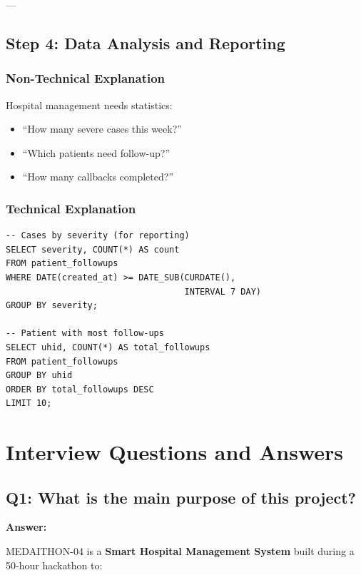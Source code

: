\documentclass[12pt,a4paper]{article}
\begin{document}
---

\subsection{Step 4: Data Analysis and Reporting}

\subsubsection{Non-Technical Explanation}

Hospital management needs statistics:

\begin{itemize}
    \item ``How many severe cases this week?''
    \item ``Which patients need follow-up?''
    \item ``How many callbacks completed?''
\end{itemize}

\subsubsection{Technical Explanation}

\begin{lstlisting}[caption={Analytics Queries}]
-- Cases by severity (for reporting)
SELECT severity, COUNT(*) AS count
FROM patient_followups
WHERE DATE(created_at) >= DATE_SUB(CURDATE(), 
                                   INTERVAL 7 DAY)
GROUP BY severity;

-- Patient with most follow-ups
SELECT uhid, COUNT(*) AS total_followups
FROM patient_followups
GROUP BY uhid
ORDER BY total_followups DESC
LIMIT 10;
\end{lstlisting}

\section{Interview Questions and Answers}

\subsection{Q1: What is the main purpose of this project?}

\textbf{Answer:}

MEDAITHON-04 is a \textbf{Smart Hospital Management System} built during a 50-hour hackathon to:
\end{document}
